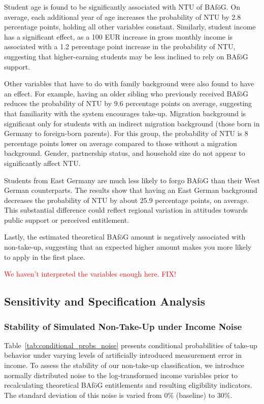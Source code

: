 Student age is found to be significantly associated with NTU of BAföG. 
On average, each additional year of age increases the probability of NTU by 2.8 percentage points, holding all other variables constant. 
Similarly, student income has a significant effect, as a 100 EUR increase in gross monthly income is associated with a 1.2 percentage point increase in the probability of NTU, suggesting that higher-earning students may be less inclined to rely on BAföG support. 


Other variables that have to do with family background were also found to have an effect. 
For example, having an older sibling who previously received BAföG reduces the probability of NTU by 9.6 percentage points on average, suggesting that familiarity with the system encourages take-up. 
Migration background is significant only for students with an indirect migration background (those born in Germany to foreign-born parents). 
For this group, the probability of NTU is 8 percentage points lower on average compared to those without a migration background.  
Gender, partnership status, and household size do not appear to significantly affect NTU.

Students from East Germany are much less likely to forgo BAföG than their West German counterparts. The results show that having an East German background decreases the probability of NTU by about 25.9 percentage points, on average. This substantial difference could reflect regional variation in attitudes towards public support or perceived entitlement.

Lastly, the estimated theoretical BAföG amount is negatively associated with non-take-up, suggesting that an expected higher amount makes you more likely to apply in the first place.

\textcolor{red}{We haven't interpreted the variables enough here. FIX!}

\subsection{Sensitivity and Specification Analysis}
\subsubsection{Stability of Simulated Non-Take-Up under Income Noise}
Table~\ref{tab:conditional_probs_noise} presents conditional probabilities of take-up behavior under varying levels of artificially introduced measurement error in income. 
To assess the stability of our non-take-up classification, we introduce normally distributed noise to the log-transformed income variables prior to recalculating theoretical BAföG entitlements and resulting eligibility indicators. 
The standard deviation of this noise is varied from 0\% (baseline) to 30\%.

